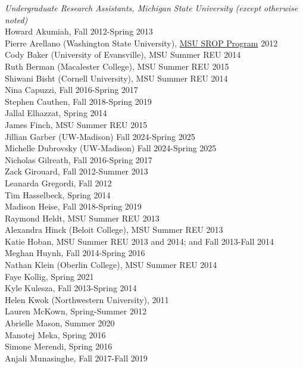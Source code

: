 \documentclass[9pt]{extarticle}
\begin{document}
\emph{Undergraduate Research Assistants, Michigan State University (except otherwise noted)} \\[1pt]
Howard Akumiah, Fall 2012-Spring 2013 \\
Pierre Arellano (Washington State University), \href{http://grad.msu.edu/srop/}{MSU SROP Program} 2012 \\
Cody Baker (University of Evansville), MSU Summer REU 2014 \\
Ruth Berman (Macalester College), MSU Summer REU 2015 \\
Shiwani Bisht (Cornell University), MSU Summer REU 2014 \\
Nina Capuzzi, Fall 2016-Spring 2017 \\
Stephen Cauthen, Fall 2018-Spring 2019 \\
Jallal Elhazzat, Spring 2014 \\
James Finch, MSU Summer REU 2015 \\
Jillian Garber (UW-Madison) Fall 2024-Spring 2025 \\
Michelle Dubrovsky (UW-Madison) Fall 2024-Spring 2025 \\
Nicholas Gilreath, Fall 2016-Spring 2017 \\
Zack Girouard, Fall 2012-Summer 2013 \\
Leanarda Gregordi, Fall 2012 \\
Tim Hasselbeck, Spring 2014 \\
Madison Heise, Fall 2018-Spring 2019 \\
Raymond Heldt, MSU Summer REU 2013 \\
Alexandra Hinck (Beloit College), MSU Summer REU 2013 \\
Katie Hoban, MSU Summer REU 2013 and 2014; and Fall 2013-Fall 2014 \\
Meghan Huynh, Fall 2014-Spring 2016 \\
Nathan Klein (Oberlin College), MSU Summer REU 2014 \\
Faye Kollig, Spring 2021 \\
Kyle Kulesza, Fall 2013-Spring 2014 \\
Helen Kwok (Northwestern University), 2011 \\
Lauren McKown, Spring-Summer 2012 \\
Abrielle Mason, Summer 2020 \\
Manotej Meka, Spring 2016 \\
Simone Merendi, Spring 2016 \\
Anjali Munasinghe, Fall 2017-Fall 2019 \\
\end{document}
